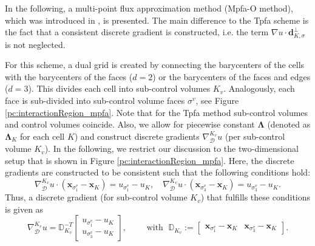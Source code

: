 In the following, a multi-point flux approximation method (Mpfa-O method), which was introduced in \citet{A3:aavatsmark:2002}, is presented. The main difference to the Tpfa scheme is the fact that a consistent discrete gradient is constructed, i.e. the term $\nabla u \cdot \mathbf{d}^{\bot}_{K,\sigma}$ is not neglected.

For this scheme, a dual grid is created by connecting the barycenters of the cells with the barycenters of the faces ($d=2$) or the barycenters of the faces and edges ($d=3$). This divides each cell into sub-control volumes $K_v$. Analogously, each face is sub-divided into sub-control volume faces $\sigma^v$, see Figure \ref{pc:interactionRegion_mpfa}. Note that for the Tpfa method sub-control volumes and control volumes coincide. Also, we allow for piecewise constant $\mathbf{\Lambda}$ (denoted as $\mathbf{\Lambda}_K$ for each cell $K$) and construct discrete gradients $\nabla_\mathcal{D}^{K_v} u$ (per sub-control volume $K_v$).
In the following, we restrict our discussion to the two-dimensional setup that is shown in Figure \ref{pc:interactionRegion_mpfa}.
Here, the discrete gradients are constructed to be consistent such that the following conditions hold:
\begin{equation}
\nabla_\mathcal{D}^{K_v} u \cdot (\mathbf{x}_{\sigma^v_1}- \mathbf{x}_{K}) = u_{\sigma^v_1} - u_K, \quad \nabla_\mathcal{D}^{K_v} u \cdot (\mathbf{x}_{\sigma^v_3}- \mathbf{x}_{K}) = u_{\sigma^v_3} - u_K.
\end{equation}
Thus, a discrete gradient (for sub-control volume $K_v$) that fulfills  these conditions is given as
\begin{equation}
\nabla_\mathcal{D}^{K_v} u  = \mathbb{D}^{-T}_{K_v}
 \begin{bmatrix}
  u_{\sigma^v_1} - u_K \\
  u_{\sigma^v_3} - u_K
 \end{bmatrix}, \qquad \text{ with }\; \mathbb{D}_{K_v} :=
  \begin{bmatrix}
   \mathbf{x}_{\sigma^v_1}- \mathbf{x}_K & \mathbf{x}_{\sigma^v_3} - \mathbf{x}_K
 \end{bmatrix}.
 \label{eq:MPFAGradientRecons}
\end{equation}

